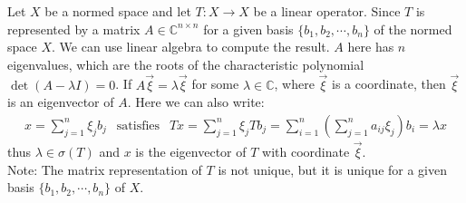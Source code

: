 \documentclass[11pt]{book}
\theoremstyle{break}
\theoremstyle{break}
\newcommand{\C}{\mathbb{C}}
\newcommand{\note}{\color{red}Note: \color{black}}
\begin{document}
Let $X$ be a normed space and let $T:X \to X$ be a linear operator. Since $T$ is represented by a matrix $A \in \C^{n\times n}$ for a given basis $\{b_1,b_2,\cdots, b_n\}$ of the normed space $X$. We can use linear algebra to compute the result. $A$ here has $n$ eigenvalues, which are the roots of the characteristic polynomial $\det(A- \lambda I) = 0$. If $A\vec{\xi} = \lambda \vec{\xi}$ for some $\lambda \in \C$, where $\vec{\xi}$ is a coordinate, then $\vec{\xi}$ is an eigenvector of $A$. Here we can also write:
\begin{align*}
x = \sum_{j=1}^n \xi_j b_j \ \ \text{ satisfies }\ \ Tx = \sum_{j=1}^n \xi_j Tb_j = \sum_{i=1}^n \left( \sum_{j=1}^n a_{ij}\xi_j \right) b_i = \lambda x
\end{align*}
thus $\lambda \in \sigma(T)$ and $x$ is the eigenvector of $T$ with coordinate $\vec{\xi}$. \\

\note The matrix representation of $T$ is not unique, but it is unique for a given basis $\{b_1,b_2,\cdots, b_n\}$ of $X$.\\
\end{document}
